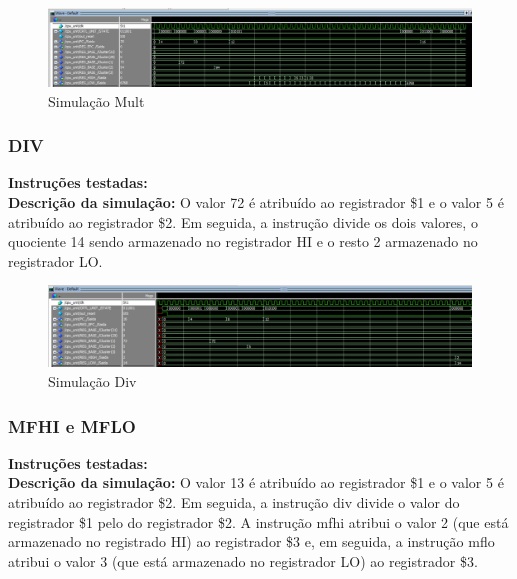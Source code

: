 \begin{figure}[htbp!]
\centering
\includegraphics[width=1\textwidth]{figure/simulacao_mult.png}
\caption{Simulação Mult} 
\label{fig:imagem_massa}
\end{figure}

\newpage

\subsubsection{DIV}
\textbf{Instruções testadas:}
 \\

\textbf{Descrição da simulação:}  O valor 72 é atribuído ao registrador \$1 e o valor 5 é atribuído ao registrador \$2. Em seguida, a instrução divide os dois valores, o quociente 14 sendo armazenado no registrador HI e o resto 2 armazenado no registrador LO.   \\

\begin{figure}[htbp!]
\centering
\includegraphics[width=1\textwidth]{figure/simulacao_div.png}
\caption{Simulação Div} 
\label{fig:imagem_massa}
\end{figure}

\subsubsection{MFHI e MFLO}
\textbf{Instruções testadas:}
 \\

\textbf{Descrição da simulação:} O valor 13 é atribuído ao registrador \$1 e o valor 5 é atribuído ao registrador \$2. Em seguida, a instrução div divide o valor do registrador \$1 pelo do registrador \$2. A instrução mfhi atribui o valor 2 (que está armazenado no registrado HI) ao registrador \$3 e, em seguida, a instrução mflo atribui o valor 3 (que está armazenado no registrador LO) ao registrador \$3.\\

